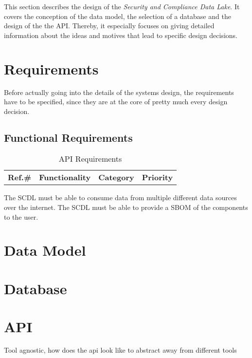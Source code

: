 
This section describes the design of the \textit{Security and Compliance Data Lake}. It covers the conception of the data model, the selection of a database and the design of the the API. Thereby, it especially focuses on giving detailed information about the ideas and motives that lead to specific design decisions.

\section{Requirements}
Before actually going into the details of the systems design, the requirements have to be specified, since they are at the core of pretty much every design decision. 

\subsection{Functional Requirements}
\begin{table}[H]
	\begin{tabularx}{\linewidth}{|l|X|l|l|}
		\hline
		\rowcolor{lightgray}\multicolumn{4}{|l|}{\cellcolor{lightgray}{\textbf{A1: API}}} \\
		\hline
		\rowcolor{lightgray}
		\textbf{Ref.\#} & \textbf{Functionality} & \textbf{Category} & \textbf{Priority} \\
		\hline
	\end{tabularx}
	\caption[API Requirements]{API Requirements}
	\label{Tab:API Requirements}
\end{table}
The SCDL must be able to consume data from multiple different data sources over the internet.
The SCDL must be able to provide a SBOM of the components to the user.




\section{Data Model}

\section{Database}
\section{API}
Tool agnostic, how does the api look like to abstract away from different tools
